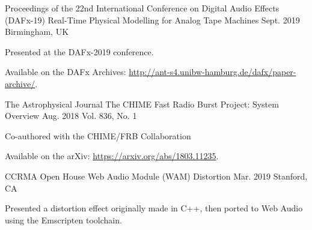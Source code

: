

\begin{cventries}

  \cventry
    {Proceedings of the 22nd International Conference on Digital Audio Effects (DAFx-19)} %
    {Real-Time Physical Modelling for Analog Tape Machines} %
    {Sept. 2019} %
    {Birmingham, UK} %
    {
      \begin{cvitems} %
        \item {Presented at the DAFx-2019 conference.}
        \item {Available on the DAFx Archives: \url{http://ant-s4.unibw-hamburg.de/dafx/paper-archive/}.}
      \end{cvitems}
    }

    \cventry
    {The Astrophysical Journal} %
    {The CHIME Fast Radio Burst Project: System Overview} %
    {Aug. 2018} %
    {Vol. 836, No. 1} %
    {
      \begin{cvitems} %
        \item {Co-authored with the CHIME/FRB Collaboration}
        \item {Available on the arXiv: \url{https://arxiv.org/abs/1803.11235}.}
      \end{cvitems}
    }

    \cventry
    {CCRMA Open House} %
    {Web Audio Module (WAM) Distortion} %
    {Mar. 2019} %
    {Stanford, CA} %
    {
      \begin{cvitems} %
        \item {Presented a distortion effect originally made in C++, then ported to Web Audio using the Emscripten toolchain.}
      \end{cvitems}
    }

\end{cventries}
